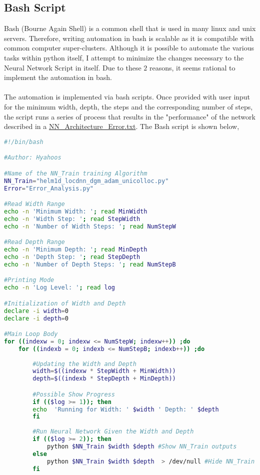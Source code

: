 \documentclass[a4paper, 12pt]{report}
\begin{document}
\begin{center}
\section{Bash Script}
\begin{comment}
\end{comment}
Bash (Bourne Again Shell) is a common shell that is used in many linux and unix servers. Therefore, writing automation in bash is scalable as it is compatible with common computer super-clusters. Although it is possible to automate the various tasks within python itself, I attempt to minimize the changes necessary to the Neural Network Script in itself. Due to these $2$ reasons, it seems rational to implement the automation in bash. 
\\~\\The automation is implemented via bash scripts. Once provided with user input for the minimum width, depth, the steps and the corresponding number of steps, the script runs a series of process that results in the "performance" of the network described in a \url{NN_Architecture_Error.txt}. The Bash script is shown below,
\begin{lstlisting}[language=Bash]
#!/bin/bash

#Author: Hyahoos

#Name of the NN_Train training Algorithm
NN_Train="helm1d_locdnn_dgm_adam_unicolloc.py"
Error="Error_Analysis.py"

#Read Width Range
echo -n 'Minimum Width: '; read MinWidth
echo -n 'Width Step: '; read StepWidth
echo -n 'Number of Width Steps: '; read NumStepW

#Read Depth Range
echo -n 'Minimum Depth: '; read MinDepth
echo -n 'Depth Step: '; read StepDepth
echo -n 'Number of Depth Steps: '; read NumStepB

#Printing Mode
echo -n 'Log Level: '; read log

#Initialization of Width and Depth
declare -i width=0
declare -i depth=0

#Main Loop Body
for ((indexw = 0; indexw <= NumStepW; indexw++)) ;do
    for ((indexb = 0; indexb <= NumStepB; indexb++)) ;do
        
        #Updating the Width and Depth
        width=$((indexw * StepWidth + MinWidth)) 
        depth=$((indexb * StepDepth + MinDepth)) 

        #Possible Show Progress
        if (($log >= 1)); then
        echo  'Running for Width: ' $width ' Depth: ' $depth
        fi
        
        #Run Neural Network Given the Width and Depth
        if (($log >= 2)); then
            python $NN_Train $width $depth #Show NN_Train outputs
        else
            python $NN_Train $width $depth  > /dev/null #Hide NN_Train outputs
        fi
        

\end{lstlisting}
\end{center}
\end{document}
